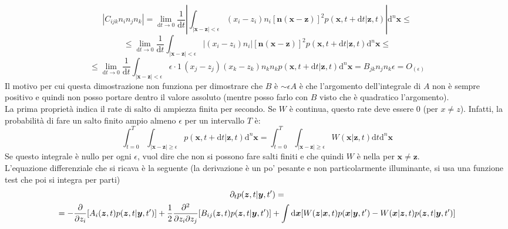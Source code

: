 \documentclass[a4paper,12pt]{article}
\renewcommand{\arg}[1]{_{(#1)}}
\theoremstyle{plain}
\renewcommand{\vec}[1]{{\boldsymbol{#1}}}
\theoremstyle{definition}
\newcommand{\f}[2]{\frac{#1}{#2}}
\renewcommand{\d}{\text{d}}
\newcommand{\pos}{\vec{x}}
\theoremstyle{remark}
\begin{document}
\[|C_{ijk} n_in_jn_k|=\lim_{\d t\rightarrow0}\f{1}{\d t}|\int_{|\pos-\vec{z}|<\epsilon} (x_i-z_i)n_i\left[\vec{n}(\pos-\vec{z})\right]^2{p(\pos,t+\d t|\vec{z},t)} |  \d^n\pos\le\]\[\le\lim_{\d t\rightarrow0}\f{1}{\d t}\int_{|\pos-\vec{z}|<\epsilon} |(x_i-z_i)n_i|\left[\vec{n}(\pos-\vec{z})\right]^2{p(\pos,t+\d t|\vec{z},t)}   \d^n	\pos\le\]\[\le\lim_{\d t\rightarrow0}\f{1}{\d t}\int_{|\pos-\vec{z}|<\epsilon} \epsilon\cdot 1 \,(x_j-z_j)(x_k-z_k)n_kn_k{p(\pos,t+\d t|\vec{z},t)}   \d^n\pos=B_{jk}n_jn_k \epsilon=O\arg{\epsilon}\]
Il motivo per cui questa dimostrazione non funziona per dimostrare che $B$ è $\sim\epsilon A$ è che l'argomento dell'integrale di $A$ non è sempre positivo e quindi non posso portare dentro il valore assoluto (mentre posso farlo con $B$ visto che è quadratico l'argomento).
\\La prima proprietà indica il rate di salto di ampiezza finita per secondo. Se $W$ è continua, questo rate deve essere $0$ (per $x\ne z$). Infatti, la probabilità di fare un salto finito ampio almeno $\epsilon$ per un intervallo $T$ è:
\[\int_{t=0}^{T}\int_{|\pos-\vec{z}|\ge\epsilon}		{p(\pos,t+\d t|\vec{z},t)}\d^n\pos=\int_{t=0}^T\int_{|\pos-\vec{z}|\ge\epsilon}	W(\pos|\vec{z},t) \d t\d^n\pos\]	
Se questo integrale è nullo per ogni $\epsilon$, vuol dire che non si possono fare salti finiti e che quindi $W$ è nella per $\pos\ne\vec{z}$.\\			
L'equazione differenziale che si ricava è la seguente (la derivazione è un po' pesante e non particolarmente illuminante, si usa una funzione test che poi si integra per parti)
\begin{multline}
\partial_t p(\vec{z},t|\vec{y},t')=\\=-\pdv{z_i}[A_i(\vec{z},t) p(\vec{z},t|\vec{y},t')]+\frac{1}{2}\pdv{}{z_i}{z_j}[B_{ij}(\vec{z},t)p(\vec{z},t|\vec{y},t')]+\int \d \pos [W(\vec{z}|\pos, t)p(\pos|\vec{y},t')-W(\vec{x}|\vec{z}, t)p(\vec{z},t|\vec{y},t')]\end{multline}
\end{document}
